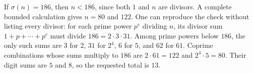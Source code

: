 If $\sigma(n)=186$, then $n<186$, since both $1$ and $n$ are divisors. A complete bounded calculation gives $n=80$ and $122$. One can reproduce the check without listing every divisor: for each prime power $p^e$ dividing $n$, its divisor sum $1+p+\cdots+p^e$ must divide $186=2\cdot3\cdot31$. Among prime powers below $186$, the only such sums are $3$ for $2$, $31$ for $2^4$, $6$ for $5$, and $62$ for $61$. Coprime combinations whose sums multiply to $186$ are $2\cdot61=122$ and $2^4\cdot5=80$. Their digit sums are $5$ and $8$, so the requested total is $\boxed{13}$.
